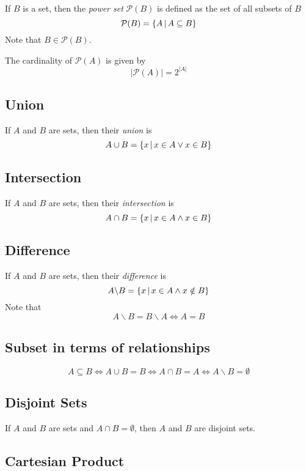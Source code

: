 \documentclass[a4paper]{article}
\begin{document}
If \(B\) is a set, then the \textit{power set} \(\mathcal{P}(B)\)
is defined as the set of all subsets of \(B\)
\[
    \mathcal{P}(B)=\{A \,|\, A\subseteq B\}
\]
Note that \(B\in\mathcal{P}(B)\).

The cardinality of \(\mathcal{P}(A)\) is given by
\[
    |\mathcal{P}(A)| = 2^{|A|}
\]

\subsection{Union}

If \(A\) and \(B\) are sets, then their \textit{union} is
\[
    A \cup B = \{x \,|\, x \in A \lor x \in B\}
\]

\subsection{Intersection}

If \(A\) and \(B\) are sets, then their \textit{intersection} is
\[
    A \cap B = \{x \,|\, x \in A \land x \in B\}
\]

\subsection{Difference}

If \(A\) and \(B\) are sets, then their \textit{difference} is
\[
    A \backslash B = \{x \,|\, x \in A \land x \notin B\}
\]
Note that
\[
    A \backslash B = B \backslash A
    \iff A = B
\]

\subsection{Subset in terms of relationships}

\[
    A \subseteq B
    \iff
    A \cup B = B
    \iff
    A \cap B = A
    \iff
    A \backslash B = \emptyset
\]

\subsection{Disjoint Sets}

If \(A\) and \(B\) are sets and \(A \cap B = \emptyset \), then \(A\)
and \(B\) are disjoint sets.

\subsection{Cartesian Product}
\end{document}
